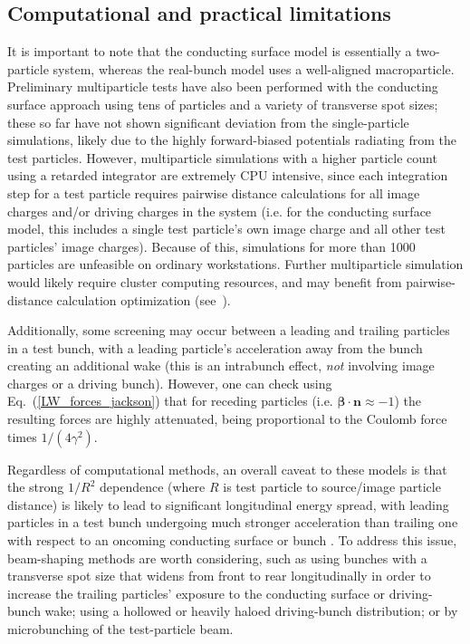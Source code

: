 \documentclass[reprint,
               amsmath,amssymb,nofootinbib, aps%
              ]{revtex4-2}
\begin{document}
\subsection{Computational and practical limitations}
It is important to note that the conducting surface model is essentially a two-particle system, whereas the real-bunch model uses a well-aligned macroparticle. Preliminary multiparticle tests have also been performed with the conducting surface approach using tens of particles and a variety of transverse spot sizes; these so far have not shown significant deviation from the single-particle simulations, likely due to the highly forward-biased potentials radiating from the test particles. However, multiparticle simulations with a higher particle count using a retarded integrator are extremely CPU intensive, since each integration step for a test particle requires pairwise distance calculations for all image charges and/or driving charges in the system (i.e. for the conducting surface model, this includes a single test particle's own image charge and all other test particles' image charges). Because of this, simulations for more than 1000 particles are unfeasible on ordinary workstations. Further multiparticle simulation would likely require cluster computing resources, and may benefit from pairwise-distance calculation optimization (see~\cite[pp.~62--69]{folsom_thesis}). %

Additionally, some screening may occur between a leading and trailing particles in a test bunch, with a leading particle's acceleration away from the bunch creating an additional wake (this is an intrabunch effect, \textit{not} involving image charges or a driving bunch). However, one can check using Eq.~(\ref{LW_forces_jackson}) that for receding particles (i.e. $\boldsymbol{\beta}\cdot\boldsymbol{n}\approx-1$) the resulting forces are highly attenuated, being proportional to the Coulomb force times $1/(4\gamma^2)$.

Regardless of computational methods, an overall caveat to these models is that the strong $1/R^2$ dependence (where $R$ is test particle to source/image particle distance) is likely to lead to significant longitudinal energy spread, with leading particles in a test bunch undergoing much stronger acceleration than trailing one with respect to an oncoming conducting surface or bunch . To address this issue, beam-shaping methods are worth considering, such as using bunches with a transverse spot size that widens from front to rear longitudinally in order to increase the trailing particles' exposure to the conducting surface or driving-bunch wake; using a hollowed or heavily haloed driving-bunch distribution; or by microbunching of the test-particle beam.
\end{document}
